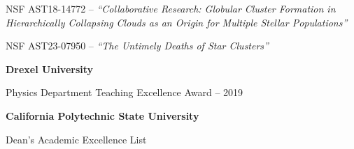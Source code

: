 \documentclass[twoside]{drexel-thesis}
\begin{document}
\begin{vita}
\quad NSF AST18-14772 -- \emph{``Collaborative Research: Globular Cluster Formation in Hierarchically Collapsing Clouds as an Origin for Multiple Stellar Populations''}

\quad NSF AST23-07950 -- \emph{``The Untimely Deaths of Star Clusters''}


\textbf{Drexel University}

\quad Physics Department Teaching Excellence Award -- 2019

\textbf{California Polytechnic State University}

\quad Dean's Academic Excellence List

\end{vita}
\end{document}
